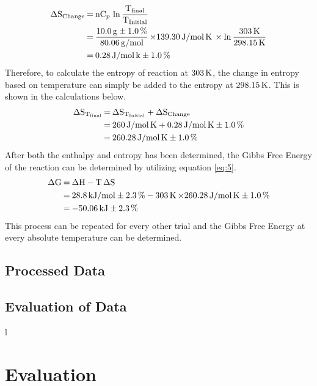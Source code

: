 \documentclass{article}
\begin{document}
\begin{equation}
    \begin{split}
        \ce{ 
        \Delta S_{Change} &= nC_p \ln \frac{T_{final}}{T_{Initial}} \\
        &= \frac{10.0 g \pm 1.0\%}{80.06 g/mol} \times} \ce{139.30 J/mol K \times \ln \frac{303K}{298.15K} \\
        &= 0.28 J/mol k \pm 1.0\%
        }
    \end{split}
\end{equation}
Therefore, to calculate the entropy of reaction at $\ce{303K}$, the change in entropy based on temperature can simply be added to the entropy at $\ce{298.15K}$. This is shown in the calculations below.
\begin{equation}
    \begin{split}
        \ce{
        \Delta S_{T_{final}} &= \Delta S_{T_{Initial}} + \Delta S_{Change} \\
        &= 260 J/mol K + 0.28 J/mol K \pm 1.0\% \\
        &= 260.28 J/mol K \pm 1.0\%
        }
    \end{split}
\end{equation}
After both the enthalpy and entropy has been determined, the Gibbs Free Energy of the reaction can be determined by utilizing equation \ref{eq:5}.
\begin{equation}
    \begin{split}
        \ce{
        \Delta G &= \Delta H - T \Delta S \\
        &= 28.8 kJ/mol \pm 2.3\% - 303K \times} \ce{260.28 J/mol K \pm 1.0\% \\ 
        &= -50.06 kJ \pm 2.3\%
        }
    \end{split}
\end{equation}
This process can be repeated for every other trial and the Gibbs Free Energy at every absolute temperature can be determined. 

\subsection{Processed Data}

\subsection{Evaluation of Data}l

\section{Evaluation}
\end{document}
